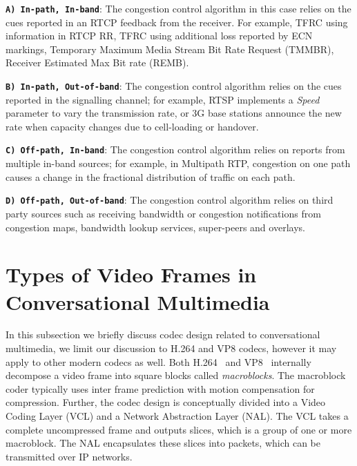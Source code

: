 \textbf{\texttt{A) In-path, In-band}}: The congestion control algorithm in
this case relies on the cues reported in an RTCP feedback from the receiver.
For example, TFRC using information in RTCP RR, TFRC using additional loss
reported by ECN markings, Temporary Maximum Media Stream Bit Rate Request
(TMMBR), Receiver Estimated Max Bit rate (REMB).

\textbf{\texttt{B) In-path, Out-of-band}}: The congestion control algorithm
relies on the cues reported in the signalling channel; for example, RTSP implements
a \emph{Speed} parameter to vary the transmission rate, or 3G base stations announce
the new rate when capacity changes due to cell-loading or handover.


\textbf{\texttt{C) Off-path, In-band}}: The congestion control algorithm
relies on reports from multiple in-band sources; for example, in Multipath
RTP, congestion on one path causes a change in the fractional distribution of
traffic on each path.

\textbf{\texttt{D) Off-path, Out-of-band}}: The congestion control
algorithm relies on third party sources such as receiving bandwidth or
congestion notifications from congestion maps, bandwidth lookup services,
super-peers and overlays.




\section{Types of Video Frames in Conversational Multimedia}

In this subsection we briefly discuss codec design related to conversational
multimedia, we limit our discussion to H.264 and VP8 codecs, however it may
apply to other modern codecs as well. Both H.264~\cite{h264} and
VP8~\cite{rfc6386} internally decompose a video frame into square blocks
called \emph{macroblocks}. The macroblock coder typically uses inter frame
prediction with motion compensation for compression. Further, the codec design
is conceptually divided into a Video Coding Layer (VCL) and a Network
Abstraction Layer (NAL). The VCL takes a complete uncompressed frame and
outputs slices, which is a group of one or more macroblock. The NAL
encapsulates these slices into packets, which can be transmitted over IP
networks.

